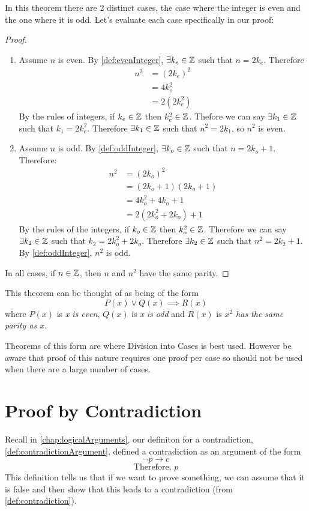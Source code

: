 In this theorem there are 2 distinct cases, the case where the integer is even and the one where it is odd. Let's evaluate each case specifically in our proof:
\begin{proof}
    \begin{enumerate}
        \item Assume $n$ is even. By \cref{def:evenInteger}, $\exists k_e \in \mathbb{Z}$ such that $n = 2k_e$. Therefore
              \begin{align*}
                  n^2 & = (2k_e)^2              \\
                      & = 4k_e^2                \\
                      & = 2 \left(2k_e^2\right)
              \end{align*}
              By the rules of integers, if $k_e \in \mathbb{Z}$ then $k_e^2 \in \mathbb{Z}$. Thefore we can say $\exists k_1 \in \mathbb{Z}$ such that $k_1 = 2k_e^2$. Therefore $\exists k_1 \in \mathbb{Z}$ such that $n^2 = 2k_1$, so $n^2$ is even.
        \item Assume $n$ is odd. By \cref{def:oddInteger}, $\exists k_o \in \mathbb{Z}$ such that $n = 2k_o + 1$. Therefore:
              \begin{align*}
                  n^2 & = (2k_o)^2             \\
                      & = (2k_o + 1)(2k_o + 1) \\
                      & = 4k_o^2 + 4k_o + 1    \\
                      & = 2(2k_o^2 + 2k_o) + 1
              \end{align*}
              By the rules of the integers, if $k_o \in \mathbb{Z}$ then $k_o^2 \in \mathbb{Z}$. Therefore we can say $\exists k_2 \in \mathbb{Z}$ such that $k_2 = 2k_o^2 + 2k_o$. Therefore $\exists k_2 \in \mathbb{Z}$ such that $n^2 = 2k_2 + 1$. By \cref{def:oddInteger}, $n^2$ is odd.
    \end{enumerate}
    In all cases, if $n \in \mathbb{Z}$, then $n$ and $n^2$ have the same parity.
\end{proof}

This theorem can be thought of as being of the form
$$P(x) \lor Q(x) \implies R(x)$$
where $P(x)$ is \emph{x is even}, $Q(x)$ is \emph{x is odd} and $R(x)$ is \emph{$x^2$ has the same parity as $x$}.

Theorems of this form are where Division into Cases is best used. However be aware that proof of this nature requires one proof per case so should not be used when there are a large number of cases.

\section{Proof by Contradiction}
Recall in \cref{chap:logicalArguments}, our definiton for a contradiction,  \cref{def:contradictionArgument}, defined a contradiction as an argument of the form
$$ \lnot p \to c$$
$$\text{Therefore, } p$$
This definition tells us that if we want to prove something, we can assume that it is false and then show that this leads to a contradiction (from \cref{def:contradiction}).


